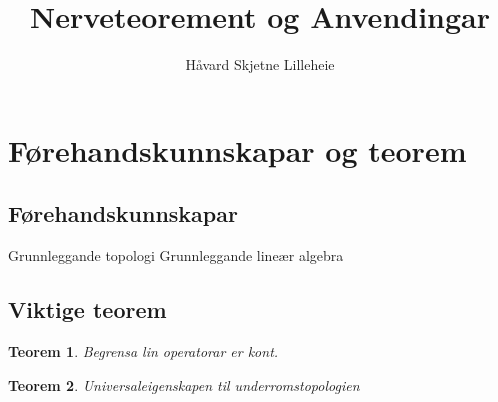 \documentclass[a4paper, titlepage, 12pt, norsk]{article}
\title{Nerveteorement og Anvendingar}
\author{Håvard Skjetne Lilleheie}
\theoremstyle{plain}
\newtheorem{theorem}{Teorem}[section]
\theoremstyle{definition}
\begin{document}
\maketitle

\section{Førehandskunnskapar og teorem}

\subsection{Førehandskunnskapar}

Grunnleggande topologi
Grunnleggande lineær algebra

\subsection{Viktige teorem}

\begin{theorem}
	Begrensa lin operatorar er kont.
\end{theorem}

\begin{theorem}
	Universaleigenskapen til underromstopologien
\end{theorem}
\end{document}
